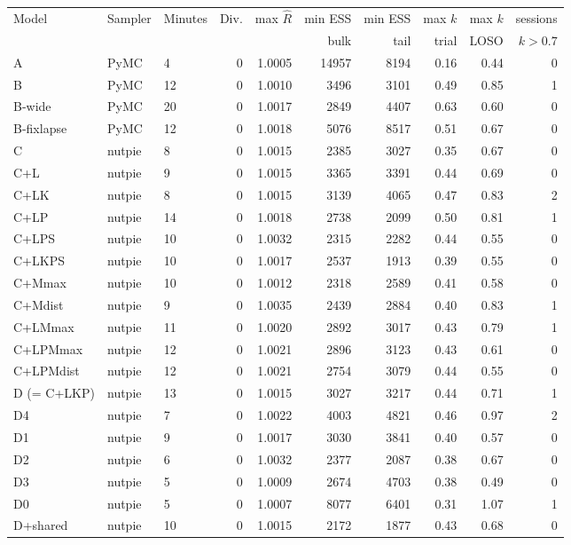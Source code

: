 \begin{tabular}{@{}lllrrrrrrr@{}}
\toprule
Model & Sampler & Minutes & Div. & max $\hat R$ & min ESS & min ESS & max $k$ & max $k$ & sessions \\
 & & & & & bulk & tail & trial & LOSO & $k>0.7$ \\
\midrule
A & PyMC & 4 & 0 & 1.0005 & 14957 & 8194 & 0.16 & 0.44 & 0 \\
B & PyMC & 12 & 0 & 1.0010 & 3496 & 3101 & 0.49 & 0.85 & 1 \\
B-wide & PyMC & 20 & 0 & 1.0017 & 2849 & 4407 & 0.63 & 0.60 & 0 \\
B-fixlapse & PyMC & 12 & 0 & 1.0018 & 5076 & 8517 & 0.51 & 0.67 & 0 \\
C & nutpie & 8 & 0 & 1.0015 & 2385 & 3027 & 0.35 & 0.67 & 0 \\
C+L & nutpie & 9 & 0 & 1.0015 & 3365 & 3391 & 0.44 & 0.69 & 0 \\
C+LK & nutpie & 8 & 0 & 1.0015 & 3139 & 4065 & 0.47 & 0.83 & 2 \\
C+LP & nutpie & 14 & 0 & 1.0018 & 2738 & 2099 & 0.50 & 0.81 & 1 \\
C+LPS & nutpie & 10 & 0 & 1.0032 & 2315 & 2282 & 0.44 & 0.55 & 0 \\
C+LKPS & nutpie & 10 & 0 & 1.0017 & 2537 & 1913 & 0.39 & 0.55 & 0 \\
C+Mmax & nutpie & 10 & 0 & 1.0012 & 2318 & 2589 & 0.41 & 0.58 & 0 \\
C+Mdist & nutpie & 9 & 0 & 1.0035 & 2439 & 2884 & 0.40 & 0.83 & 1 \\
C+LMmax & nutpie & 11 & 0 & 1.0020 & 2892 & 3017 & 0.43 & 0.79 & 1 \\
C+LPMmax & nutpie & 12 & 0 & 1.0021 & 2896 & 3123 & 0.43 & 0.61 & 0 \\
C+LPMdist & nutpie & 12 & 0 & 1.0021 & 2754 & 3079 & 0.44 & 0.55 & 0 \\
D (= C+LKP) & nutpie & 13 & 0 & 1.0015 & 3027 & 3217 & 0.44 & 0.71 & 1 \\
D4 & nutpie & 7 & 0 & 1.0022 & 4003 & 4821 & 0.46 & 0.97 & 2 \\
D1 & nutpie & 9 & 0 & 1.0017 & 3030 & 3841 & 0.40 & 0.57 & 0 \\
D2 & nutpie & 6 & 0 & 1.0032 & 2377 & 2087 & 0.38 & 0.67 & 0 \\
D3 & nutpie & 5 & 0 & 1.0009 & 2674 & 4703 & 0.38 & 0.49 & 0 \\
D0 & nutpie & 5 & 0 & 1.0007 & 8077 & 6401 & 0.31 & 1.07 & 1 \\
D+shared & nutpie & 10 & 0 & 1.0015 & 2172 & 1877 & 0.43 & 0.68 & 0 \\

\end{tabular}
